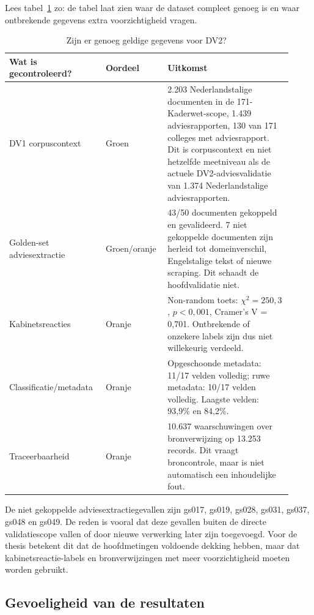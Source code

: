 Lees tabel~\ref{tab:dv2-dekking-missingness} zo: de tabel laat zien waar de dataset compleet genoeg is en waar ontbrekende gegevens extra voorzichtigheid vragen.

\begin{table}[htbp]
\centering
\small
\caption{Zijn er genoeg geldige gegevens voor DV2?}
\label{tab:dv2-dekking-missingness}
\begin{tabular}{p{0.30\linewidth}p{0.20\linewidth}p{0.42\linewidth}}
\hline
Wat is gecontroleerd? & Oordeel & Uitkomst \\
\hline
DV1 corpuscontext & Groen & 2.203 Nederlandstalige documenten in de 171-Kaderwet-scope, 1.439 adviesrapporten, 130 van 171 colleges met adviesrapport. Dit is corpuscontext en niet hetzelfde meetniveau als de actuele DV2-adviesvalidatie van 1.374 Nederlandstalige adviesrapporten. \\
Golden-set adviesextractie & Groen/oranje & 43/50 documenten gekoppeld en gevalideerd. 7 niet gekoppelde documenten zijn herleid tot domeinverschil, Engelstalige tekst of nieuwe scraping. Dit schaadt de hoofdvalidatie niet. \\
Kabinetsreacties & Oranje & Non-random toets: $\chi^2=250{,}3$, $p<0{,}001$, Cramer's V = 0,701. Ontbrekende of onzekere labels zijn dus niet willekeurig verdeeld. \\
Classificatie/metadata & Oranje & Opgeschoonde metadata: 11/17 velden volledig; ruwe metadata: 10/17 velden volledig. Laagste velden: 93,9\% en 84,2\%. \\
Traceerbaarheid & Oranje & 10.637 waarschuwingen over bronverwijzing op 13.253 records. Dit vraagt broncontrole, maar is niet automatisch een inhoudelijke fout. \\
\hline
\end{tabular}
\end{table}

De niet gekoppelde adviesextractiegevallen zijn gs017, gs019, gs028, gs031, gs037, gs048 en gs049. De reden is vooral dat deze gevallen buiten de directe validatiescope vallen of door nieuwe verwerking later zijn toegevoegd. Voor de thesis betekent dit dat de hoofdmetingen voldoende dekking hebben, maar dat kabinetsreactie-labels en bronverwijzingen met meer voorzichtigheid moeten worden gebruikt.

\subsection{Gevoeligheid van de resultaten}
\label{subsec:dv2-robuustheid-sensitiviteit}

